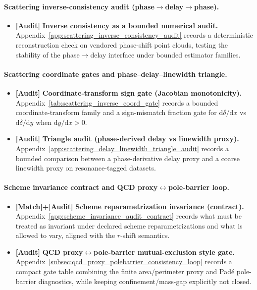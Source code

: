 \paragraph{Scattering inverse-consistency audit (phase$\to$delay$\to$phase).}
\begin{itemize}
\item \textbf{[Audit]} \textbf{Inverse consistency as a bounded numerical audit.}
Appendix~\ref{app:scattering_inverse_consistency_audit} records a deterministic reconstruction check on vendored phase-shift point clouds, testing the stability of the phase$\to$delay interface under bounded estimator families.
\end{itemize}

\paragraph{Scattering coordinate gates and phase--delay--linewidth triangle.}
\begin{itemize}
\item \textbf{[Audit]} \textbf{Coordinate-transform sign gate (Jacobian monotonicity).}
Appendix~\ref{tab:scattering_inverse_coord_gate} records a bounded coordinate-transform family and a sign-mismatch fraction gate for $\mathrm{d}\delta/\mathrm{d}x$ vs $\mathrm{d}\delta/\mathrm{d}y$ when $\mathrm{d}y/\mathrm{d}x>0$.
\item \textbf{[Audit]} \textbf{Triangle audit (phase-derived delay vs linewidth proxy).}
Appendix~\ref{app:scattering_delay_linewidth_triangle_audit} records a bounded comparison between a phase-derivative delay proxy and a coarse linewidth proxy on resonance-tagged datasets.
\end{itemize}

\paragraph{Scheme invariance contract and QCD proxy$\leftrightarrow$pole-barrier loop.}
\begin{itemize}
\item \textbf{[Match]+[Audit]} \textbf{Scheme reparametrization invariance (contract).}
Appendix~\ref{app:scheme_invariance_audit_contract} records what must be treated as invariant under declared scheme reparametrizations and what is allowed to vary, aligned with the $r$-shift semantics.
\item \textbf{[Audit]} \textbf{QCD proxy$\leftrightarrow$pole-barrier mutual-exclusion style gate.}
Appendix~\ref{subsec:qcd_proxy_polebarrier_consistency_loop} records a compact gate table combining the finite area/perimeter proxy and Pad\'e pole-barrier diagnostics, while keeping confinement/mass-gap explicitly not closed.
\end{itemize}

